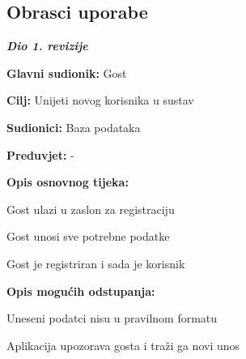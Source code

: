 			\eject 
			
			
				
			\subsection{Obrasci uporabe}
				
				\textbf{\textit{Dio 1. revizije}}\\
					

					\noindent {}
					\begin{packed_item}
	
						\item \textbf{Glavni sudionik: }Gost
						\item  \textbf{Cilj: }Unijeti novog korisnika u sustav
						\item  \textbf{Sudionici: }Baza podataka
						\item  \textbf{Preduvjet: }-
						\item  \textbf{Opis osnovnog tijeka: }
						
						\item[] \begin{packed_enum}
							\item Gost ulazi u zaslon za registraciju
							\item Gost unosi sve potrebne podatke
							\item Gost je registriran i sada je korisnik
						\end{packed_enum}
						
						\item  \textbf{Opis mogućih odstupanja:}
						
						\item[] \begin{packed_item}
	
							\item[2.a] Uneseni podatci nisu u pravilnom formatu
							\item[] \begin{packed_enum}
								\item Aplikacija upozorava gosta i traži ga novi unos
							\end{packed_enum}
						\end{packed_item}
					\end{packed_item}
					
